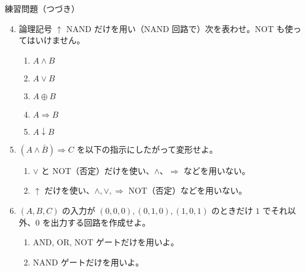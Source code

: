 \documentclass[10pt, dvipdfmx]{beamer}
\begin{document}
\begin{frame}{練習問題（つづき）}
\begin{enumerate}
\setcounter{enumi}{3}

\item 論理記号 $\uparrow$ NAND だけを用い（NAND 回路で）次を表わせ。NOT も使ってはいけません。
\begin{enumerate}
\item $A \land B$
\item $A \lor B$
\item $A \oplus B$
\item $A \Rightarrow B$
\item $A \downarrow B$
\end{enumerate}

\item $(A\land \bar{B}) \Rightarrow C$ を以下の指示にしたがって変形せよ。
\begin{enumerate}
\item $\lor$ と NOT（否定）だけを使い、$\land$、$\Rightarrow$ などを用いない。
\item $\uparrow$ だけを使い、$\land, \lor, \Rightarrow$ NOT（否定）などを用いない。
\end{enumerate}

\item $(A, B, C)$ の入力が $(0,0,0), (0,1,0), (1,0,1)$ のときだけ $1$ でそれ以外、$0$ を出力する回路を作成せよ。

\begin{enumerate}
\item  AND, OR, NOT ゲートだけを用いよ。
\item  NAND ゲートだけを用いよ。
\end{enumerate}
\end{enumerate}

\end{frame}
%
%
%
\end{document}
